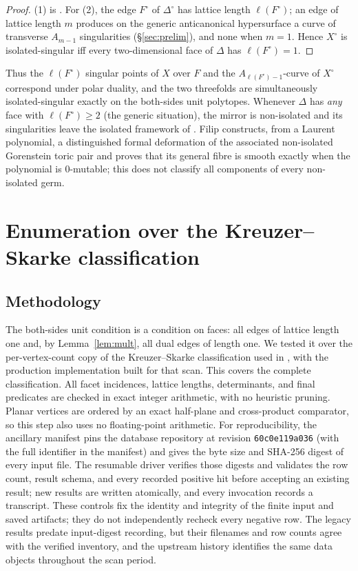 \documentclass[11pt]{amsart}
\theoremstyle{definition}
\theoremstyle{remark}
\begin{document}
\begin{proof}
(1) is \cite[Prop.~3.1]{paper1}.  For (2), the edge $F^\circ$ of
$\Delta^\circ$ has lattice length $\ell(F^\circ)$; an edge of lattice length
$m$ produces on the generic anticanonical hypersurface a curve of transverse
$A_{m-1}$ singularities (\S\ref{sec:prelim}), and none when $m = 1$.  Hence
$X^\circ$ is isolated-singular iff every two-dimensional face of $\Delta$
has $\ell(F^\circ) = 1$.
\end{proof}

Thus the $\ell(F^\circ)$ singular points of $X$ over $F$ and the
$A_{\ell(F^\circ)-1}$-curve of $X^\circ$ correspond under polar duality,
and the two
threefolds are simultaneously isolated-singular exactly on the both-sides
unit polytopes.  Whenever $\Delta$ has \emph{any} face with
$\ell(F^\circ) \ge 2$ (the generic situation), the mirror is
non-isolated and its singularities leave the isolated framework of
\cite{Altmann97,CFP}.  Filip \cite{Filip25} constructs, from a Laurent
polynomial, a distinguished formal deformation of the associated
non-isolated Gorenstein toric pair and proves that its general fibre is
smooth exactly when the polynomial is $0$-mutable; this does not classify
all components of every non-isolated germ.

\section{Enumeration over the Kreuzer--Skarke
classification}\label{sec:census}

\subsection{Methodology}\label{subsec:method}
The both-sides unit condition is a condition on faces: all edges of
lattice length one
and, by Lemma~\ref{lem:mult}, all dual edges of length one.  We tested it
over
the per-vertex-count copy of the Kreuzer--Skarke classification used in
\cite[\S6.1]{paper1}, with the production implementation built for that
scan.  This covers the complete classification.  All facet incidences, lattice lengths,
determinants, and final predicates are checked in exact integer arithmetic,
with no heuristic pruning.  Planar vertices are ordered by an exact
half-plane and cross-product comparator, so this step also uses no
floating-point arithmetic.  For reproducibility, the ancillary manifest
pins the database repository at revision
\texttt{60c0e119a036} (with the full identifier in the manifest) and gives
the byte size and SHA-256 digest of every input file.  The resumable driver
verifies those digests and validates the row count, result schema, and every
recorded positive hit before accepting an existing result; new results are
written atomically, and every invocation records a transcript.  These
controls fix the identity and integrity of the finite input and saved
artifacts; they do not independently recheck every negative row.
The legacy results predate input-digest recording, but their filenames and
row counts agree with the verified inventory, and the upstream history
identifies the same data objects throughout the scan period.
\end{document}
